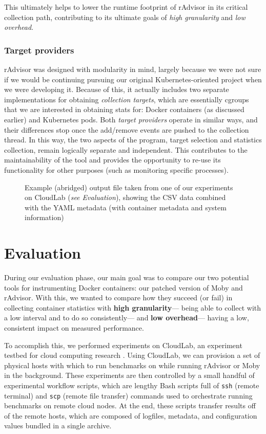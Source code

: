 \documentclass[a4paper,11pt]{article}
\newcommand{\granularitybf}{\textbf{high granularity}\xspace}
\newcommand{\granularity}{\textit{high granularity}\xspace}
\newcommand{\overheadbf}{\textbf{low overhead}\xspace}
\newcommand{\overhead}{\textit{low overhead}\xspace}
\begin{document}
This ultimately helps to lower the runtime footprint of rAdvisor in its critical collection path,
contributing to its ultimate goals of \granularity and \overhead.

\subsubsection{Target providers}

rAdvisor was designed with modularity in mind,
largely because we were not sure if we would be continuing pursuing our original Kubernetes-oriented project
when we were developing it.
Because of this, it actually includes two separate implementations for obtaining \textit{collection targets},
which are essentially cgroups that we are interested in obtaining stats for:
Docker containers (as discussed earlier) and Kubernetes pods.
Both \textit{target providers} operate in similar ways,
and their differences stop once the add/remove events are pushed to the collection thread.
In this way, the two aspects of the program, target selection and statistics collection,
remain logically separate and independent.
This contributes to the maintainability of the tool and provides the opportunity to
re-use its functionality for other purposes (such as monitoring specific processes).

\begin{figure}[H]
    \caption{
        Example (abridged) output file taken from one of our experiments on CloudLab (\textit{see Evaluation}),
        showing the CSV data combined with the YAML metadata (with container metadata and system information)
    }
    \label{fig:radvisor_log}
\end{figure}

\section{Evaluation}

During our evaluation phase, our main goal was to compare our two potential tools
for instrumenting Docker containers:
our patched version of Moby and rAdvisor.
With this, we wanted to compare how they succeed (or fail)
in collecting container statistics with \granularitybf---%
being able to collect with a low interval and to do so consistently---%
and \overheadbf---%
having a low, consistent impact on measured performance.

\vspace{-0.25em}
To accomplish this, we performed experiments on CloudLab,
an experiment testbed for cloud computing research \cite{Cloudlab,CloudlabInfo}.
Using CloudLab, we can provision a set of physical hosts with which to run benchmarks on
while running rAdvisor or Moby in the background.
These experiments are then controlled by a small handful of experimental workflow scripts,
which are lengthy Bash scripts full of \texttt{ssh} (remote terminal)
and \texttt{scp} (remote file transfer) commands
used to orchestrate running benchmarks on remote cloud nodes.
At the end, these scripts transfer results off of the remote hosts,
which are composed of logfiles, metadata, and configuration values bundled in a single archive.
\end{document}
